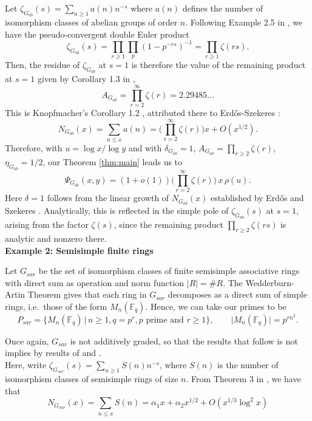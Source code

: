 \documentclass[a4paper]{amsart}
\begin{document}
  Let $\zeta_{G_{ab}}(s)=\sum_{n\geq1}a(n)n^{-s}$ where $a(n)$ defines the number of isomorphism classes of abelian groups of order $n$. Following Example 2.5 in \cite{knopfmacher2015abstract}, we have the pseudo-convergent double Euler product 
  $$\zeta_{G_{ab}}(s) = \prod_{r\geq1}\prod_p (1-p^{-rs})^{-1}
  = \prod_{r\geq1}\zeta(rs).$$
  Then, the residue of $\zeta_{G_{ab}}$ at $s=1$ is therefore the value of the remaining product at $s=1$ given by Corollary 1.3 in \cite{knopfmacher1970arithmetical}, 
  $$ A_{G_{ab}} = \prod_{r=2}^{\infty}\zeta(r) = 2.29485\dots  $$
    This is Knopfmacher's Corollary 1.2 \cite{knopfmacher2015abstract}, attributed there to Erd\H{o}s-Szekeres \cite[\S1,pp. 97--101]{erdos1934abelian}:
    $$
  N_{G_{ab}}(x) = \sum_{n\leq x} a(n) = \Big(\prod_{r=2}^{\infty}\zeta(r)\Big)x + O(x^{1/2}).$$
  Therefore, with $u = \log{x}/\log{y}$ and with $\delta_{G_{ab}}=1$, $A_{G_{ab}}=\prod_{r\ge2}\zeta(r)$, $\eta_{G_{ab}}=1/2$, our Theorem \ref{thm:main} leads us to
  $$
   \Psi_{G_{ab}}(x,y) = (1+o(1))\Big(\prod_{r=2}^{\infty}\zeta(r)\Big)\,x\,\rho(u).
   $$
Here $\delta=1$ follows from the linear growth of
$N_{G_{ab}}(x)$ established by Erd\H{o}s and Szekeres
\cite[\S1, pp. 97--101]{erdos1934abelian}.
Analytically, this is reflected in the simple pole
of $\zeta_{G_{ab}}(s)$ at $s=1$, arising from the
factor $\zeta(s)$, since the remaining product
$\prod_{r\ge2}\zeta(rs)$ is analytic and nonzero there.\\

\textbf{Example 2: Semisimple
finite rings}

Let $G_{sar}$ be the set of isomorphism classes of finite semisimple associative rings with direct sum as operation and norm function $|R| = \# R$. The Wedderburn-Artin Theorem gives that each ring in $G_{sar}$ decomposes as a direct sum of simple rings, i.e.\ those of the form $M_n(\mathbb{F}_q)$. Hence, we can take our primes to be
$$
  P_{sar} = \{M_n(\mathbb{F}_q)\,|\, n\geq 1, q = p^r, p \text{ prime and } r \geq 1\}, \qquad |M_n(\mathbb{F}_q)| = p^{rn^2}.
$$ 

Once again, $G_{sar}$ is not additively graded, so that the results that follow is not implies by results of \cite{warlimont1991arithmetical} and \cite{manstavivcius1992remarks}.\\

Here, write $\zeta_{G_{sar}}(s)=\sum_{n\geq1}S(n)n^{-s}$, where $S(n)$ is the number of isomorphism classes of semisimple rings of size $n$. From Theorem $3$ in \cite{knopfmacher1970arithmetical}, we have that 
$$N_{G_{sar}}(x) = \sum_{n\leq x}S(n) = \alpha_1 x + \alpha_2 x^{1/2} + O(x^{1/3}\log^2 x)$$
\end{document}
